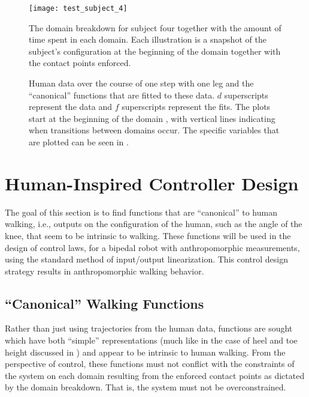 \begin{figure}[t]
  \centering
  \texttt{[image: test\_subject\_4]}
  \caption{The domain breakdown for subject four together with the amount of time spent in each domain. Each illustration is a snapshot of the subject's configuration at the beginning of the domain together with the contact points enforced.}
  \label{fred}
\end{figure}

\begin{figure}[t!]
  \centering
  \caption{Human data over the course of one step with one leg and the ``canonical'' functions that are fitted to these data. $d$ superscripts represent the data and $f$ superscripts represent the fits. The plots start at the beginning of the domain {\DA}, with vertical lines indicating when transitions between domains occur. The specific variables that are plotted can be seen in .}
  \label{fig:constraints-fitting}
\end{figure}

\section{Human-Inspired Controller Design} \noindent
The goal of this section is to find functions that are ``canonical'' to human walking, i.e., outputs on the configuration of the human, such as the angle of the knee, that seem to be intrinsic to walking. These functions will be used in the design of control laws, for a bipedal robot with anthropomorphic measurements, using the standard method of input/output linearization.\cite{Sastry99}\xspace This control design strategy results in anthropomorphic walking behavior.

\subsection{``Canonical'' Walking Functions} \label{sec:functions} \noindent
Rather than just using trajectories from the human data, functions are sought which have both ``simple'' representations (much like in the case of heel and toe height discussed in ) and appear to be intrinsic to human walking. From the perspective of control, these functions must not conflict with the constraints of the system on each domain resulting from the enforced contact points as dictated by the domain breakdown. That is, the system must not be overconstrained.

